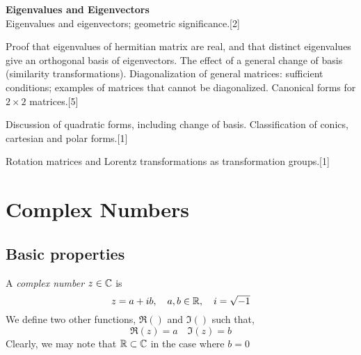 \documentclass{article}
\numberwithin{equation}{section}
\begin{document}
{    \vspace{10pt}
    \noindent\textbf{Eigenvalues and Eigenvectors}\\
    Eigenvalues and eigenvectors; geometric significance.\hspace*{\fill}[2]

    \vspace{5pt}
    \noindent Proof that eigenvalues of hermitian matrix are real, and that distinct eigenvalues give an orthogonal basis of eigenvectors. The effect of a general change of basis (similarity transformations). Diagonalization of general matrices: sufficient conditions; examples of matrices that cannot be diagonalized. Canonical forms for $2 \times 2$ matrices.\hspace*{\fill}[5]

    \vspace{5pt}
    \noindent Discussion of quadratic forms, including change of basis. Classification of conics, cartesian and polar forms.\hspace*{\fill}[1]

    \vspace{5pt}
    \noindent Rotation matrices and Lorentz transformations as transformation groups.\hspace*{\fill}[1]}

\tableofcontents

\section{Complex Numbers}
\subsection{Basic properties}
\begin{defi}
    A \emph{complex number} $z \in \mathbb{C}$ is
    \[
        z = a + ib, \quad a, b \in \mathbb{R}, \quad i = \sqrt{-1}  
    \]
    We define two other functions, $\Re()$ and $\Im()$ such that,
    \[
        \Re(z) = a \quad \Im(z) = b 
    \]
    Clearly, we may note that $\mathbb{R} \subset \mathbb{C}$ in the case where $b = 0$
\end{defi}
\end{document}
